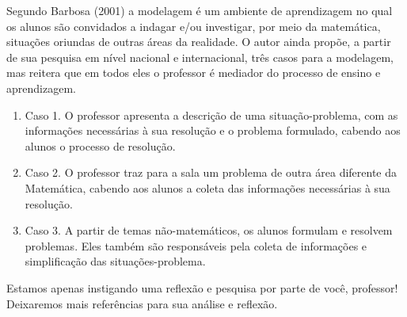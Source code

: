 \begin{apresentacao}
  Segundo Barbosa (2001) a modelagem é um ambiente de aprendizagem no qual os alunos são convidados a indagar e/ou investigar, por meio da matemática, situações oriundas de outras áreas da realidade. O autor ainda propõe, a partir de sua pesquisa em nível nacional e internacional, três casos para a modelagem, mas reitera que em todos eles o professor é mediador do processo de ensino e aprendizagem.

  \begin{enumerate}[label=\titem{\arabic*)}]
  \item Caso 1. O professor apresenta a descrição de uma situação-problema, com as informações necessárias à sua resolução e o problema formulado, cabendo aos alunos o processo de resolução. 
  \item Caso 2. O professor traz para a sala um problema de outra área diferente da Matemática, cabendo aos alunos a coleta das informações necessárias à sua resolução. 
  \item Caso 3. A partir de temas não-matemáticos, os alunos formulam e resolvem problemas. Eles também são responsáveis pela coleta de informações e simplificação das situações-problema. 
  \end{enumerate}

  Estamos apenas instigando uma reflexão e pesquisa por parte de você, professor! Deixaremos mais referências para sua análise e reflexão.
\end{apresentacao}

